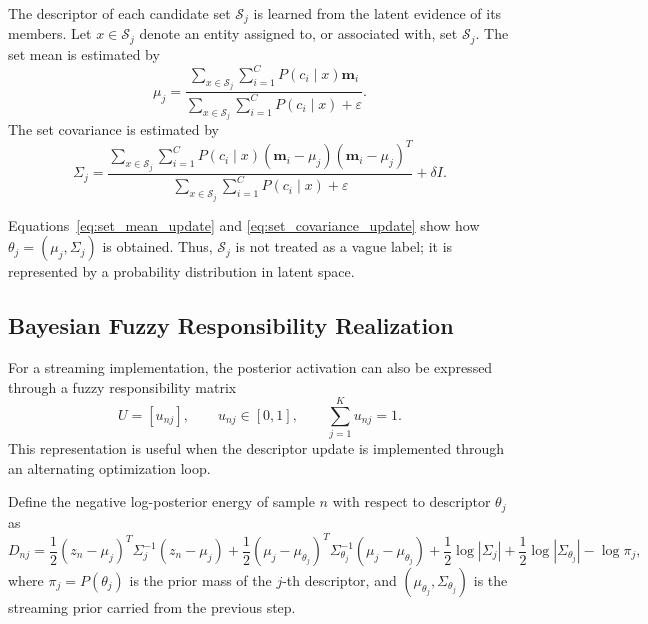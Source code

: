 \documentclass{article}
\theoremstyle{plain}
\theoremstyle{definition}
\theoremstyle{remark}
\begin{document}
The descriptor of each candidate set \(\mathcal S_j\) is learned from the latent evidence of its members. Let \(x\in\mathcal S_j\) denote an entity assigned to, or associated with, set \(\mathcal S_j\). The set mean is estimated by
\begin{equation}
	\label{eq:set_mean_update}
	\mu_j
	=
	\frac{
		\sum_{x\in\mathcal S_j}
		\sum_{i=1}^{C}
		P(c_i\mid x)\mathbf m_i
	}{
		\sum_{x\in\mathcal S_j}
		\sum_{i=1}^{C}
		P(c_i\mid x)
		+\varepsilon
	}.
\end{equation}
The set covariance is estimated by
\begin{equation}
	\label{eq:set_covariance_update}
	\Sigma_j
	=
	\frac{
		\sum_{x\in\mathcal S_j}
		\sum_{i=1}^{C}
		P(c_i\mid x)
		(\mathbf m_i-\mu_j)(\mathbf m_i-\mu_j)^T
	}{
		\sum_{x\in\mathcal S_j}
		\sum_{i=1}^{C}
		P(c_i\mid x)
		+\varepsilon
	}
	+
	\delta I.
\end{equation}

Equations~\eqref{eq:set_mean_update} and \eqref{eq:set_covariance_update} show how \(\theta_j=(\mu_j,\Sigma_j)\) is obtained. Thus, \(\mathcal S_j\) is not treated as a vague label; it is represented by a probability distribution in latent space.

\subsection{Bayesian Fuzzy Responsibility Realization}
\label{subsec:bayesian_fuzzy_realization}

For a streaming implementation, the posterior activation can also be expressed through a fuzzy responsibility matrix
\[
U=[u_{nj}],
\qquad
u_{nj}\in[0,1],
\qquad
\sum_{j=1}^{K}u_{nj}=1.
\]
This representation is useful when the descriptor update is implemented through an alternating optimization loop.

Define the negative log-posterior energy of sample \(n\) with respect to descriptor \(\theta_j\) as
\begin{equation}
	\label{eq:energy}
	D_{nj}
	=
	\frac{1}{2}
	(z_n-\mu_j)^T\Sigma_j^{-1}(z_n-\mu_j)
	+
	\frac{1}{2}
	(\mu_j-\mu_{\theta_j})^T
	\Sigma_{\theta_j}^{-1}
	(\mu_j-\mu_{\theta_j})
	+
	\frac{1}{2}\log|\Sigma_j|
	+
	\frac{1}{2}\log|\Sigma_{\theta_j}|
	-
	\log \pi_j ,
\end{equation}
where \(\pi_j=P(\theta_j)\) is the prior mass of the \(j\)-th descriptor, and
\((\mu_{\theta_j},\Sigma_{\theta_j})\) is the streaming prior carried from the previous step.
\end{document}
